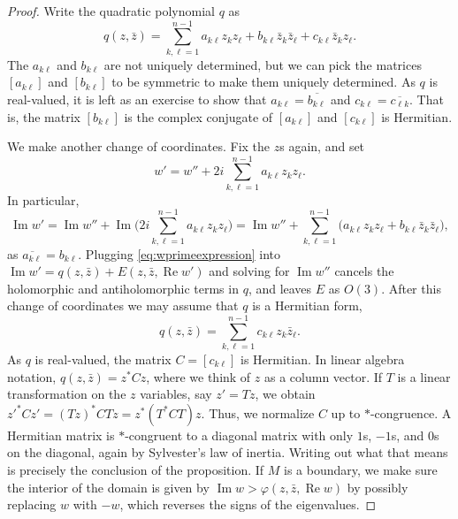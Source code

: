 \documentclass[12pt,openany]{book}
\renewcommand{\Re}{\operatorname{Re}}
\renewcommand{\Im}{\operatorname{Im}}
\theoremstyle{plain}
\theoremstyle{remark}
\theoremstyle{definition}
\theoremstyle{exercise}
\theoremstyle{example}
\begin{document}
\begin{proof}
Write the quadratic polynomial $q$ as
\begin{equation} \label{eq:generalquadraticq}
q(z,\bar{z}) =
\sum_{k,\ell=1}^{n-1}
a_{k\ell} z_kz_\ell
+
b_{k\ell} \bar{z}_k\bar{z}_\ell
+
c_{k\ell} \bar{z}_kz_\ell .
\end{equation}
The $a_{k\ell}$ and $b_{k\ell}$ are not uniquely determined, but
we can pick the matrices $[a_{k\ell}]$ and $[b_{k\ell}]$ to be symmetric
to make them uniquely determined.
As $q$ is real-valued, it is left as an exercise to show that
$a_{k\ell} = \overline{b_{k\ell}}$ and
$c_{k\ell} = \overline{c_{\ell k}}$.  That is, the
matrix $[b_{k\ell}]$ is the complex conjugate of $[a_{k\ell}]$ and
$[c_{k\ell}]$ is Hermitian.

We make another change of coordinates.  Fix the $z$s again, and set
\begin{equation} \label{eq:wprimeexpression}
w' = w'' + 2i
\sum_{k,\ell=1}^{n-1}
a_{k\ell} z_kz_\ell .
\end{equation}
In particular,
\begin{equation*}
\Im w'
= \Im w''
+ \Im \biggl(
2i
\sum_{k,\ell=1}^{n-1}
a_{k\ell} z_kz_\ell
\biggr)
=
\Im w''
+
\sum_{k,\ell=1}^{n-1}
\bigl(
a_{k\ell} z_kz_\ell
+
b_{k\ell} \bar{z}_k\bar{z}_\ell
\bigr) ,
\end{equation*}
as $\overline{a_{k\ell}} = b_{k\ell}$.  Plugging
\eqref{eq:wprimeexpression} into $\Im w' = q(z,\bar{z}) + E(z,\bar{z},\Re w')$
and solving for $\Im w''$ cancels the
holomorphic and antiholomorphic terms in $q$, and leaves $E$ as $O(3)$.
After this change of coordinates we may assume
that $q$ is a Hermitian form,
\begin{equation*}
q(z,\bar{z}) = \sum_{k,\ell=1}^{n-1} c_{k\ell} z_k \bar{z}_\ell .
\end{equation*}
As $q$ is real-valued, the matrix
$C = [ c_{k\ell} ]$ is Hermitian.  In linear algebra notation,
$q(z,\bar{z}) = z^*Cz$,
where we think of $z$ as a column vector.
If $T$ is a linear transformation on the $z$ variables, say $z'=Tz$, we
obtain ${z'}^*Cz' = {(Tz)}^*CTz = z^* ( T^*CT) z$.  Thus, we normalize $C$
up to $*$-congruence.  A Hermitian matrix
is $*$-congruent to a diagonal matrix with only $1$s, $-1$s, and $0$s on the
diagonal, again by Sylvester's law of inertia.
Writing out what that means is precisely the conclusion of the
proposition.
If $M$ is a boundary, we make sure the interior of the domain is
given by $\Im w > \varphi(z,\bar{z},\Re w)$
by possibly replacing $w$ with $-w$, which reverses the signs of the 
eigenvalues.
\end{proof}
\end{document}
